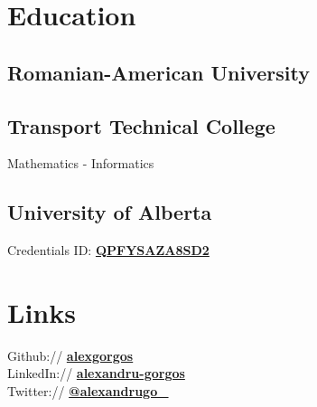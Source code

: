 \documentclass[letterpaper]{algo-resume}
\begin{document}


%
%
%
\begin{minipage}[t]{0.33\textwidth} 


\section{Education} 

\subsection{Romanian-American University}



\sectionspace 

\subsection{Transport Technical College}

Mathematics - Informatics \\

\sectionspace 

\subsection{University of Alberta}

Credentials ID: \href{https://www.coursera.org/account/accomplishments/specialization/certificate/QPFYSAZA8SD2}{\bf QPFYSAZA8SD2} \\


\section{Links} 

Github:// \href{https://github.com/alexgorgos}{\bf alexgorgos} \\
LinkedIn:// \href{https://www.linkedin.com/in/alexandru-gorgos/}{\bf alexandru-gorgos} \\
Twitter:// \href{https://twitter.com/alexandrugo_}{\bf @alexandrugo\_} \\


\end{minipage}
\end{document}
